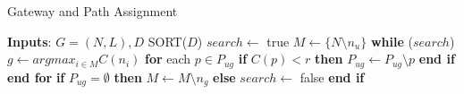 \begin{algorithm}[htbp]
  \caption{Gateway and Path Assignment}
  \label{assignment}
  \begin{algorithmic}
  \small
    \STATE \textbf{Inputs}: $G = (N, L), D$
    \vspace{2mm}
    \STATE  SORT($D$)
    \vspace{0.7mm}
    \vspace{0.7mm}
    \STATE \hspace{0.4cm} $search \leftarrow$ true
    \vspace{0.7mm}
    \STATE \hspace{0.4cm} $M \leftarrow \{N \setminus {n_u}\}$
    \vspace{0.7mm}
    \STATE \hspace{0.4cm} \textbf{while} ($search$)
    \vspace{0.7mm}
    \STATE \hspace{0.8cm} $g \leftarrow argmax_{i \in M} C(n_i)$
    \vspace{0.7mm} 
    \STATE \hspace{0.8cm} \textbf{for} each $p \in P_{ug}$
    \vspace{0.7mm}
    \STATE \hspace{1.2cm} \textbf{if} $C(p) < r$ \textbf{then}
    \vspace{0.7mm}
    \STATE \hspace{1.6cm} $P_{ug} \leftarrow P_{ug} \setminus {p}$
    \vspace{0.7mm}
    \STATE \hspace{1.2cm} \textbf{end if}
    \vspace{0.7mm}
    \STATE \hspace{0.8cm} \textbf{end for}
    \vspace{0.7mm}
    \STATE \hspace{0.8cm} \textbf{if} $P_{ug} = \emptyset$ \textbf{then}
    \vspace{0.7mm}
    \STATE \hspace{1.2cm} $M \leftarrow M \setminus {n_g}$
    \vspace{0.7mm}
    \STATE \hspace{0.8cm} \textbf{else}
    \vspace{0.7mm}
    \STATE \hspace{1.2cm} $search \leftarrow$ false
    \vspace{0.7mm}
    \STATE \hspace{0.8cm} \textbf{end if}
    \vspace{0.7mm}

\end{algorithmic}
\end{algorithm}
